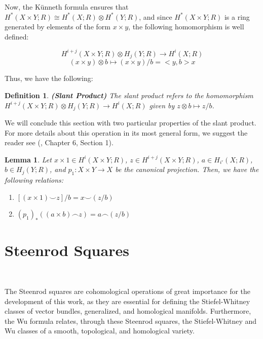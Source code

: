 \documentclass[12pt,oneside]{book}
\newtheorem{defi}   {Definition}[chapter]
\newtheorem{lem}    {Lemma}[chapter]
\newcommand{\ccup}{\smile}
\newcommand{\ccap}{\frown}
\newcommand{\tensor}{\otimes}
\begin{document}
    Now, the Künneth formula ensures that $H^{*}(X\times Y;R)\cong H^{*}(X;R)\tensor H^{*}(Y;R)$, and since 
    $H^{*}(X\times Y;R)$ is a ring generated by elements of the form $x\times y$, the following homomorphism is well defined:

    \newpage
    $$ H^{i+j}(X\times Y;R)\tensor H_{j}(Y;R)\to H^{i}(X;R) $$
    $$ (x\times y)\tensor b\mapsto (x\times y)/b=<y,b>x $$
    
    Thus, we have the following:
    
    \begin{defi}{\bf (Slant Product)}
        The slant product refers to the homomorphism $H^{i+j}(X\times Y;R)\tensor H_{j}(Y;R)\to H^{i}(X;R)$ given by 
        $z\tensor b\mapsto z/b$.
    \end{defi}
    
    We will conclude this section with two particular properties of the slant product. For more details about this operation in its most 
    general form, we suggest the reader see (\cite{spanier}, Chapter 6, Section 1).
    
    \begin{lem}\label{lema_slant}
        Let $x\times 1\in H^{i}(X\times Y;R)$, $z\in H^{i+j}(X\times Y;R)$, $a\in H_{i'}(X;R)$, $b\in H_{j}(Y;R)$, and $p_{1}:X\times Y\to X$ 
        be the canonical projection. Then, we have the following relations:
        
        \begin{enumerate}
            \item $[(x\times 1)\ccup z]/b=x\ccup(z /b)$
            \item $(p_{1})_{*}((a\times b)\ccap z)=a\ccap (z/b)$
        \end{enumerate}
    \end{lem}

    

    \section{Steenrod Squares}\label{ap_steenrod}

    \

    The Steenrod squares are cohomological operations of great importance for the development of this work, as they 
    are essential for defining the Stiefel-Whitney classes of vector bundles, 
    generalized, and homological manifolds. Furthermore, the Wu 
    formula relates, through these Steenrod squares, the Stiefel-Whitney and Wu classes of a smooth, 
    topological, and homological variety.
\end{document}
